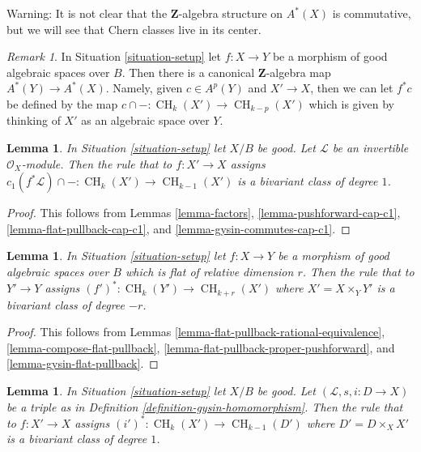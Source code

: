 \documentclass{stacks-project}
\theoremstyle{plain}
\newtheorem{lemma}[subsection]{Lemma}
\theoremstyle{definition}
\theoremstyle{remark}
\newtheorem{remark}[subsection]{Remark}
\numberwithin{equation}{subsection}
\def\CH{\mathop{\mathrm{CH}}\nolimits}
\begin{document}
\noindent
Warning: It is not clear that the $\mathbf{Z}$-algebra structure
on $A^*(X)$ is commutative, but we will see that Chern classes live
in its center.

\begin{remark}
\label{remark-pullback-cohomology}
In Situation \ref{situation-setup} let $f : X \to Y$ be a morphism of
good algebraic spaces over $B$.
Then there is a canonical $\mathbf{Z}$-algebra map $A^*(Y) \to A^*(X)$.
Namely, given $c \in A^p(Y)$ and $X' \to X$, then we can let $f^*c$
be defined by the map $c \cap - : \CH_k(X') \to \CH_{k - p}(X')$ which is
given by thinking of $X'$ as an algebraic space over $Y$.
\end{remark}

\begin{lemma}
\label{lemma-cap-c1-bivariant}
In Situation \ref{situation-setup} let $X/B$ be good.
Let $\mathcal{L}$ be an invertible $\mathcal{O}_X$-module.
Then the rule that to $f : X' \to X$ assigns
$c_1(f^*\mathcal{L}) \cap - : \CH_k(X') \to \CH_{k - 1}(X')$
is a bivariant class of degree $1$.
\end{lemma}

\begin{proof}
This follows from Lemmas \ref{lemma-factors},
\ref{lemma-pushforward-cap-c1},
\ref{lemma-flat-pullback-cap-c1}, and
\ref{lemma-gysin-commutes-cap-c1}.
\end{proof}

\begin{lemma}
\label{lemma-flat-pullback-bivariant}
In Situation \ref{situation-setup} let $f : X \to Y$ be a morphism
of good algebraic spaces over $B$ which is flat of relative dimension $r$.
Then the rule that to $Y' \to Y$ assigns
$(f')^* : \CH_k(Y') \to \CH_{k + r}(X')$ where $X' = X \times_Y Y'$
is a bivariant class of degree $-r$.
\end{lemma}

\begin{proof}
This follows from
Lemmas \ref{lemma-flat-pullback-rational-equivalence},
\ref{lemma-compose-flat-pullback},
\ref{lemma-flat-pullback-proper-pushforward}, and
\ref{lemma-gysin-flat-pullback}.
\end{proof}

\begin{lemma}
\label{lemma-gysin-bivariant}
In Situation \ref{situation-setup} let $X/B$ be good.
Let $(\mathcal{L}, s, i : D \to X)$ be a triple as in
Definition \ref{definition-gysin-homomorphism}.
Then the rule that to $f : X' \to X$ assigns
$(i')^* : \CH_k(X') \to \CH_{k - 1}(D')$ where $D' = D \times_X X'$
is a bivariant class of degree $1$.
\end{lemma}
\end{document}
